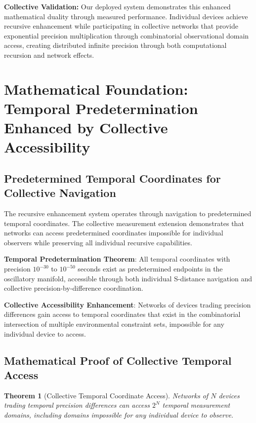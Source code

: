 \documentclass[12pt,a4paper]{article}
\newtheorem{theorem}{Theorem}[section]
\begin{document}
\textbf{Collective Validation:} Our deployed system demonstrates this enhanced mathematical duality through measured performance. Individual devices achieve recursive enhancement while participating in collective networks that provide exponential precision multiplication through combinatorial observational domain access, creating distributed infinite precision through both computational recursion and network effects.

\section{Mathematical Foundation: Temporal Predetermination Enhanced by Collective Accessibility}

\subsection{Predetermined Temporal Coordinates for Collective Navigation}

The recursive enhancement system operates through navigation to predetermined temporal coordinates. The collective measurement extension demonstrates that networks can access predetermined coordinates impossible for individual observers while preserving all individual recursive capabilities.

\textbf{Temporal Predetermination Theorem}: All temporal coordinates with precision $10^{-30}$ to $10^{-50}$ seconds exist as predetermined endpoints in the oscillatory manifold, accessible through both individual S-distance navigation and collective precision-by-difference coordination.

\textbf{Collective Accessibility Enhancement}: Networks of devices trading precision differences gain access to temporal coordinates that exist in the combinatorial intersection of multiple environmental constraint sets, impossible for any individual device to access.

\subsection{Mathematical Proof of Collective Temporal Access}

\begin{theorem}[Collective Temporal Coordinate Access]
Networks of $N$ devices trading temporal precision differences can access $2^N$ temporal measurement domains, including domains impossible for any individual device to observe.
\end{theorem}
\end{document}
